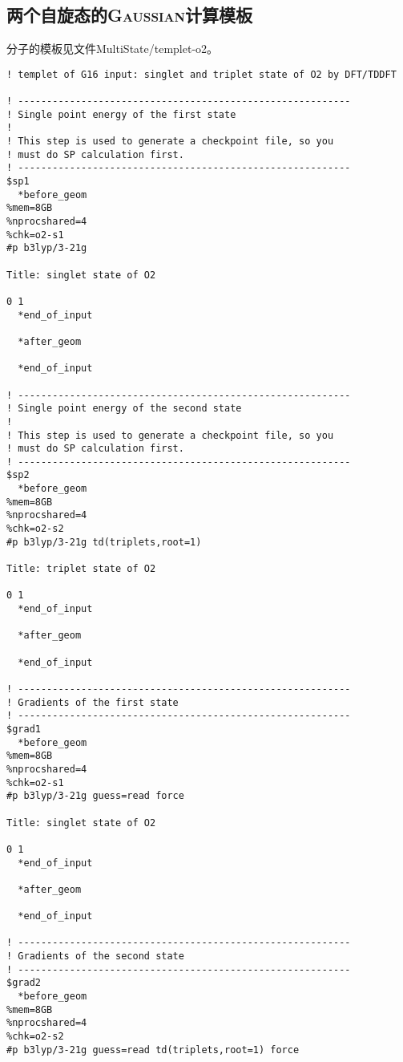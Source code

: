 \documentclass[UTF8]{ctexart}
\begin{document}
\subsection{两个自旋态的\textsc{Gaussian}计算模板}

分子的模板见文件MultiState/templet-o2。
\begin{lstlisting}[alsoletter={$*},
morekeywords={$sp1,$grad1,$freq1,$sp2,$grad2,$freq2,*before_geom,*after_geom,*end_of_input}]
! templet of G16 input: singlet and triplet state of O2 by DFT/TDDFT

! ----------------------------------------------------------
! Single point energy of the first state
!
! This step is used to generate a checkpoint file, so you
! must do SP calculation first.
! ----------------------------------------------------------
$sp1
  *before_geom
%mem=8GB
%nprocshared=4
%chk=o2-s1
#p b3lyp/3-21g

Title: singlet state of O2

0 1
  *end_of_input

  *after_geom

  *end_of_input

! ----------------------------------------------------------
! Single point energy of the second state
!
! This step is used to generate a checkpoint file, so you
! must do SP calculation first.
! ----------------------------------------------------------
$sp2
  *before_geom
%mem=8GB
%nprocshared=4
%chk=o2-s2
#p b3lyp/3-21g td(triplets,root=1)

Title: triplet state of O2

0 1
  *end_of_input

  *after_geom

  *end_of_input

! ----------------------------------------------------------
! Gradients of the first state
! ----------------------------------------------------------
$grad1
  *before_geom
%mem=8GB
%nprocshared=4
%chk=o2-s1
#p b3lyp/3-21g guess=read force

Title: singlet state of O2

0 1
  *end_of_input

  *after_geom

  *end_of_input

! ----------------------------------------------------------
! Gradients of the second state
! ----------------------------------------------------------
$grad2
  *before_geom
%mem=8GB
%nprocshared=4
%chk=o2-s2
#p b3lyp/3-21g guess=read td(triplets,root=1) force


\end{lstlisting}
\end{document}
